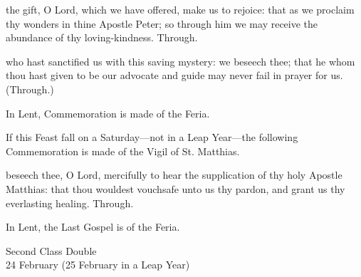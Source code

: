 
\postcommunion
{} the gift, O Lord, which we have offered, make us to rejoice: that as we proclaim thy wonders in thine Apostle Peter; so through him we may receive the abundance of thy loving-kindness. Through.

 who hast sanctified us with this saving mystery: we beseech thee; that he whom thou hast given to be our advocate and guide may never fail in prayer for us. (Through.)
\begin{rubric}
    In Lent, Commemoration is made of the Feria.%
\end{rubric}
\begin{rubric}
    If this Feast fall on a Saturday---not in a Leap Year---the following Commemoration is made of the Vigil of St. Matthias.
\end{rubric}
 beseech thee, O Lord, mercifully to hear the supplication of thy holy Apostle Matthias: that thou wouldest vouchsafe unto us thy pardon, and grant us thy everlasting healing. Through.
\begin{rubric}
    In Lent, the Last Gospel is of the Feria.
\end{rubric}

\begin{inhead}
    {Second Class Double\\
24 February (25 February in a Leap Year)}
\end{inhead}
\par\noindent
{}


